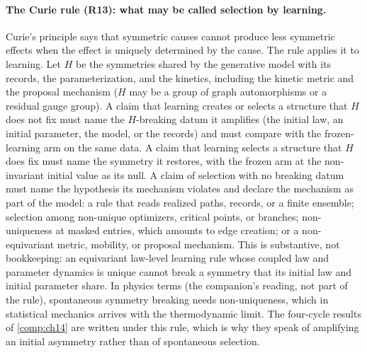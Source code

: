 \paragraph{The Curie rule (R13): what may be called selection by learning.}
Curie's principle says that symmetric causes cannot produce less symmetric effects when the effect
is uniquely determined by the cause. The rule applies it to learning. Let $H$ be the symmetries shared
by the generative model with its records, the parameterization, and the kinetics, including the
kinetic metric and the proposal mechanism ($H$ may be a group of graph automorphisms or a residual
gauge group). A claim that learning creates or selects a structure that $H$ does not fix must name
the $H$-breaking datum it amplifies (the initial law, an initial parameter, the model, or the
records) and must compare with the frozen-learning arm on the same data. A claim that learning
selects a structure that $H$ does fix must name the symmetry it restores, with the frozen arm at the
non-invariant initial value as its null. A claim of selection with no breaking datum must name the
hypothesis its mechanism violates and declare the mechanism as part of the model: a rule that reads
realized paths, records, or a finite ensemble; selection among non-unique optimizers, critical
points, or branches; non-uniqueness at masked entries, which amounts to edge creation; or a
non-equivariant metric, mobility, or proposal mechanism. This is substantive, not bookkeeping: an
equivariant law-level learning rule whose coupled law and parameter dynamics is unique cannot break a
symmetry that its initial law and initial parameter share. In physics terms (the companion's
reading, not part of the rule), spontaneous symmetry breaking needs non-uniqueness, which in
statistical mechanics arrives with the thermodynamic limit. The four-cycle results of
\cref{comp:ch14} are written under this rule, which is why they speak of amplifying an initial
asymmetry rather than of spontaneous selection.

